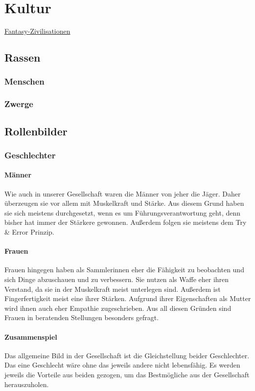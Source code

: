 \chapter{Kultur}
\href{http://www.weltenbau-wissen.de/2016/02/5-rezepte-fantasy-kulturen-zivilisationen/}{Fantasy-Zivilisationen}
\section{Rassen}
\subsection{Menschen}
\subsection{Zwerge}

\section{Rollenbilder}
\subsection{Geschlechter}
\subsubsection{Männer} 
Wie auch in unserer Gesellschaft waren die Männer von jeher die Jäger. Daher überzeugen sie vor allem mit Muskelkraft und Stärke. 
Aus diesem Grund haben sie sich meistens durchgesetzt, wenn es um Führungsverantwortung geht, denn bisher hat immer der Stärkere gewonnen. 
Außerdem folgen sie meistens dem Try \& Error Prinzip.
	
\subsubsection{Frauen} 
Frauen hingegen haben als Sammlerinnen eher die Fähigkeit zu beobachten und sich Dinge abzuschauen und zu verbessern. 
Sie nutzen als Waffe eher ihren Verstand, da sie in der Muskelkraft meist unterlegen sind. 
Außerdem ist Fingerfertigkeit meist eine ihrer Stärken.
Aufgrund ihrer Eigenschaften als Mutter wird ihnen auch eher Empathie zugeschrieben. 
Aus all diesen Gründen sind Frauen in beratenden Stellungen besonders gefragt.
	
\subsubsection{Zusammenspiel}
Das allgemeine Bild in der Gesellschaft ist die Gleichstellung beider Geschlechter. 
Das eine Geschlecht wäre ohne das jeweils andere nicht lebensfähig. 
Es werden jeweils die Vorteile aus beiden gezogen, um das Bestmögliche aus der Gesellschaft herauszuholen.

